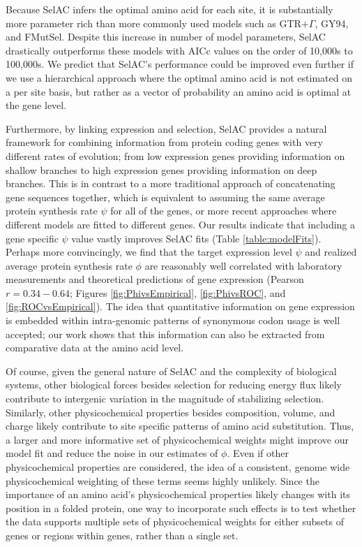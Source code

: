 \documentclass[12pt,letterpaper,fleqn]{article}
\newcommand{\PC}{physicochemical\xspace}
\newcommand{\selac}{SelAC\xspace}
\begin{document}
Because \selac infers the optimal amino acid for each site, it is substantially more parameter rich than more commonly used models such as GTR$+\Gamma$, GY94, and FMutSel.
Despite this increase in number of model parameters, \selac drastically outperforms these models with AICc values on the order of 10,000s to 100,000s.
We predict that \selac's performance could be improved even further if we use a hierarchical approach where the optimal amino acid is not estimated on a per site basis, but rather as a vector of probability an amino acid is optimal at the gene level.





Furthermore, by linking expression and selection, \selac provides a natural framework for combining information from protein coding genes with very different rates of evolution; from low expression genes providing information on shallow branches to high expression genes providing information on deep branches.
This is in contrast to a more traditional approach of concatenating gene sequences together, which is equivalent to assuming the same average protein synthesis rate $\psi$ for all of the genes, or more recent approaches where different models are fitted to different genes.
Our results indicate that including a gene specific $\psi$ value vastly improves \selac fits (Table \ref{table:modelFits}).
Perhaps more convincingly, we find that the target expression level $\psi$ and realized average protein synthesis rate $\phi$ are reasonably well correlated with laboratory measurements and theoretical predictions of gene expression (Pearson $r= 0.34-0.64$; Figures \ref{fig:PhivsEmpirical}, \ref{fig:PhivsROC}, and \ref{fig:ROCvsEmpirical}).
The idea that quantitative information on gene expression is embedded within intra-genomic patterns of synonymous codon usage is well accepted; our work shows that this information can also be extracted from comparative data at the amino acid level.

Of course, given the general nature of \selac and the complexity of biological systems, other biological forces besides selection for reducing energy flux likely contribute to intergenic variation in the magnitude of stabilizing selection.
Similarly, other physicochemical properties besides composition, volume, and charge likely contribute to site specific patterns of amino acid substitution.
Thus, a larger and more informative set of \PC weights might improve our model fit and reduce the noise in our estimates of $\phi$.
Even if other physicochemical properties are considered, the idea of a consistent, genome wide \PC weighting of these terms seems highly unlikely.
Since the importance of an amino acid's physicochemical properties likely changes with its position in a folded protein, one way to incorporate such effects is to test whether the data supports multiple sets of \PC weights for either subsets of genes or regions within genes, rather than a single set.
\end{document}
